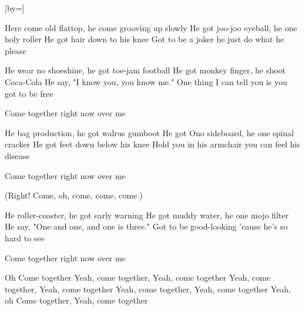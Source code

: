 

[by=]


\beginverse
Here come old flattop, he come grooving up slowly
He got joo-joo eyeball, he one holy roller
He got hair down to his knee
Got to be a joker he just do what he please

He wear no shoeshine, he got toe-jam football
He got monkey finger, he shoot Coca-Cola
He say, "I know you, you know me."
One thing I can tell you is you got to be free

Come together right now over me
\endverse

\beginverse
He bag production, he got walrus gumboot
He got Ono sideboard, he one spinal cracker
He got feet down below his knee
Hold you in his armchair you can feel his disease

Come together right now over me

(Right! Come, oh, come, come, come.)

He roller-coaster, he got early warning
He got muddy water, he one mojo filter
He say, "One and one, and one is three."
Got to be good-looking 'cause he's so hard to see

Come together right now over me
\endverse

\beginverse
Oh
Come together
Yeah, come together, Yeah, come together
Yeah, come together, Yeah, come together
Yeah, come together, Yeah, come together
Yeah, oh
Come together, Yeah, come together
\endverse




\chordson
\endsong
